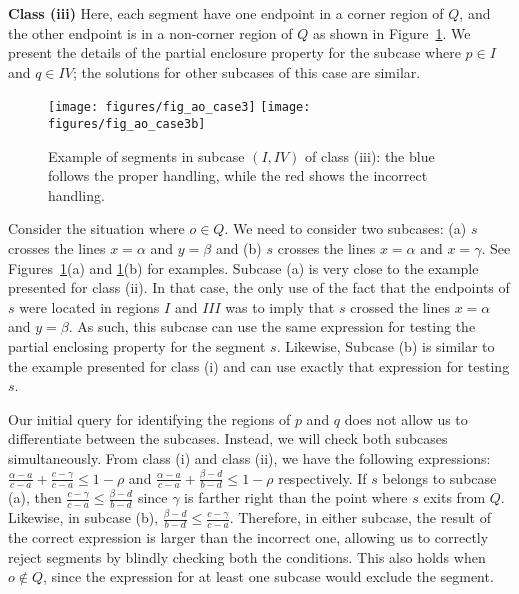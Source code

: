 {\bf Class (iii)}
Here, each segment have one endpoint in a corner region of $Q$, 
and the other endpoint is in a non-corner region of $Q$ as shown in 
Figure~\ref{fig:rectangles:ao:case3}. We present the details of the partial 
enclosure property for the subcase where $p \in I$ and $q \in IV$; the 
solutions for other subcases of this case are similar.

\begin{figure}[t]
\begin{center}
  \texttt{[image: figures/fig\_ao\_case3]}
  \hspace{1.0em}
  \texttt{[image: figures/fig\_ao\_case3b]}
  \caption{Example of segments in  subcase $(I, IV)$ of class 
  (iii): the blue follows the proper handling, while the red shows the 
  incorrect handling.}
  \label{fig:rectangles:ao:case3}
\end{center}
\end{figure}

Consider the situation where $o \in Q$. We need to consider two 
subcases: (a) $s$ crosses the lines $x=\alpha$ and $y=\beta$ and 
(b) $s$ crosses the lines $x=\alpha$ and $x=\gamma$. See 
Figures~\ref{fig:rectangles:ao:case3}(a) and 
\ref{fig:rectangles:ao:case3}(b) for examples. Subcase (a) is very 
close to the example presented for class (ii). In that case, 
the only use of the fact that the endpoints of $s$ were located in 
regions $I$ and $III$ was to imply that $s$ crossed the lines 
$x=\alpha$ and $y=\beta$. As such, this subcase can use the same 
expression for testing the partial enclosing property for the segment 
$s$. Likewise, Subcase (b) is similar to the 
example presented for class (i) and can use exactly that expression 
for testing $s$.

Our initial query for identifying the regions of $p$ and $q$ does 
not allow us to differentiate between the subcases. Instead, we will 
check both subcases simultaneously. From class (i) and class (ii), 
we have the following expressions:
$ \frac{\alpha - a}{c - a} + \frac{c - \gamma}{c - a} \leq 1 - \rho$
 and
$\frac{\alpha - a}{c - a} + \frac{\beta - d}{b - d} \leq 1 - \rho$
respectively. If $s$ belongs to subcase (a), then 
$\frac{c - \gamma}{c - a} \leq \frac{\beta - d}{b - d}$ since 
$\gamma$ is farther right than the point where $s$ exits from $Q$. 
Likewise, in subcase (b), 
$\frac{\beta - d}{b - d} \leq \frac{c - \gamma}{c - a}$.
Therefore, in either subcase, the result of the correct expression 
is larger than the incorrect one, allowing us to correctly reject 
segments by blindly checking both the conditions. This also holds when 
$o \not \in Q$, since the expression for at least one subcase would 
exclude the segment.


